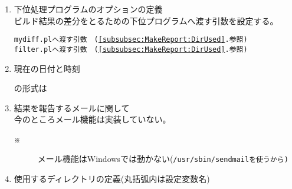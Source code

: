 \medskip
\begin{Proc}[b]
\begin{enumerate}
  \item	下位処理プログラムのオプションの定義\\
        ビルド結果の差分をとるための下位プログラムへ渡す引数を設定する。
	\def\tmpRef{\ref{subsubsec:MakeReport:DirUsed}.参照}
	\begin{narrow}[\WID]
		 \LArrowSp{5pt} \tt{mydiff.pl}へ渡す引数　(\tmpRef)\\
		 \LArrowSp{5pt} \tt{filter.pl}へ渡す引数　(\tmpRef)\\
	\end{narrow}
	
  \item	現在の日付と時刻
	\begin{narrow}[\WID]
		の形式は
	\end{narrow}

  \item	結果を報告するメールに関して\\
	今のところメール機能は実装していない。
	{\small \begin{description}
	  \item[※]
		メール機能はWindowsでは動かない(\tt{/usr/sbin/sendmail}を使うから)
	\end{description}}

  \item	\label{subsubsec:MakeReport:DirUsed}
	使用するディレクトリの定義(丸括弧内は設定変数名)
	\begin{narrow}[30pt]\begin{minipage}{.8\textwidth}
	\end{minipage}\end{narrow}


\end{enumerate}
\end{Proc}
